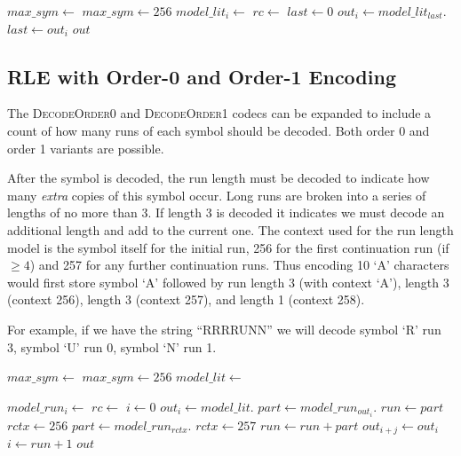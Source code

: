 \documentclass[a4paper]{article}
\begin{document}
\begin{algorithmic}[1]
  \State $max\_sym \gets $
    \State $max\_sym \gets 256$
  \EndIf
    \State $model\_lit_i \gets $
  \EndFor
  \Statex
  \State $rc \gets $
  \State $last \gets 0$
    \State $out_i \gets model\_lit_{last}.$
    \State $last \gets out_i$
  \EndFor
  \State \Return $out$
\EndFunction
\end{algorithmic}

\subsection{RLE with Order-0 and Order-1 Encoding}

The \textsc{DecodeOrder0} and \textsc{DecodeOrder1} codecs can be expanded to include a count of how many runs of each symbol should be decoded.
Both order 0 and order 1 variants are possible.

After the symbol is decoded, the run length must be decoded to
indicate how many \emph{extra} copies of this symbol occur.  Long runs
are broken into a series of lengths of no more than 3.  If length 3
is decoded it indicates we must decode an additional length and add to
the current one.  The context used for the run length model is the
symbol itself for the initial run, 256 for the first continuation run
(if $\ge 4$) and 257 for any further continuation runs.  Thus encoding
10 `A' characters would first store symbol `A' followed by run length
3 (with context `A'), length 3 (context 256), length 3 (context
257), and length 1 (context 258).

For example, if we have the string ``RRRRUNN'' we will decode
symbol `R' run 3, symbol `U' run 0, symbol `N' run 1.

\begin{algorithmic}[1]
  \State $max\_sym \gets $
    \State $max\_sym \gets 256$
  \EndIf
  \State $model\_lit \gets $

    \State $model\_run_i \gets $
  \EndFor
  \Statex
  \State $rc \gets $
  \State $i \gets 0$
    \State $out_i \gets model\_lit.$
    \State $part \gets model\_run_{out_i}.$
    \State $run \gets part$
    \State $rctx \gets 256$
      \State $part \gets model\_run_{rctx}.$
      \State $rctx \gets 257$
      \State $run \gets run + part$
    \EndWhile
      \State $out_{i+j} \gets out_i$
    \EndFor
    \State $i \gets run+1$
  \EndWhile
  \State \Return $out$
\EndFunction
\end{algorithmic}
\end{document}
